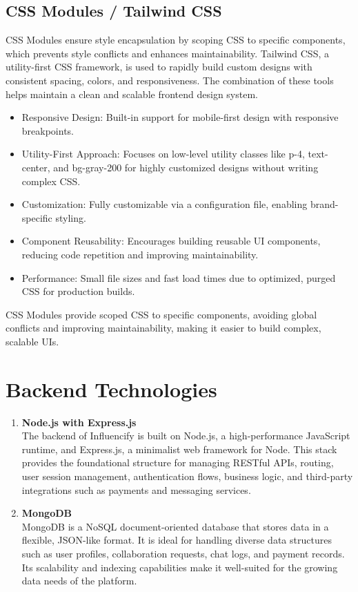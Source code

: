 \begin{justify}
\subsection{CSS Modules / Tailwind CSS} 
CSS Modules ensure style encapsulation by scoping CSS to specific components, which prevents style conflicts and enhances maintainability. Tailwind CSS, a utility-first CSS framework, is used to rapidly build custom designs with consistent spacing, colors, and responsiveness. The combination of these tools helps maintain a clean and scalable frontend design system.
\begin{itemize}
    \item 	Responsive Design: Built-in support for mobile-first design with responsive breakpoints.
    \item 	Utility-First Approach: Focuses on low-level utility classes like p-4, text-center, and bg-gray-200 for highly customized designs without writing complex CSS.
    \item 	Customization: Fully customizable via a configuration file, enabling brand-specific styling.
    \item 	Component Reusability: Encourages building reusable UI components, reducing code repetition and improving maintainability.
    \item 	Performance: Small file sizes and fast load times due to optimized, purged CSS for production builds.
    \end{itemize}

     CSS Modules provide scoped CSS to specific components, avoiding global conflicts and improving maintainability, making it easier to build complex, scalable UIs.


\section{Backend Technologies}
\begin{enumerate}
\item \textbf{Node.js with Express.js}\\
The backend of Influencify is built on Node.js, a high-performance JavaScript runtime, and Express.js, a minimalist web framework for Node. This stack provides the foundational structure for managing RESTful APIs, routing, user session management, authentication flows, business logic, and third-party integrations such as payments and messaging services.

\item\textbf{MongoDB}\\
MongoDB is a NoSQL document-oriented database that stores data in a flexible, JSON-like format. It is ideal for handling diverse data structures such as user profiles, collaboration requests, chat logs, and payment records. Its scalability and indexing capabilities make it well-suited for the growing data needs of the platform.
\end{enumerate}


\end{justify}
